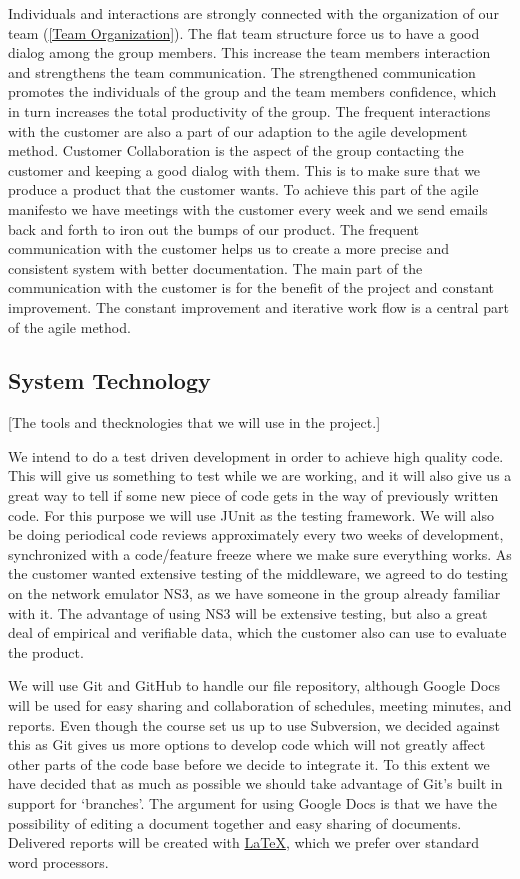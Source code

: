     Individuals and interactions are strongly connected with the organization of our team (\ref{Team Organization}). The flat team structure force us to have a good dialog among the group members. This increase the team members interaction and strengthens the team communication. The strengthened communication promotes the individuals of the group and the team members confidence, which in turn increases the total productivity of the group. The frequent interactions with the customer are also a part of our adaption to the agile development method. 
    Customer Collaboration is the aspect of the group contacting the customer and keeping a good dialog with them. This is to make sure that we produce a product that the customer wants. To achieve this part of the agile manifesto we have meetings with the customer every week and we send emails back and forth to iron out the bumps of our product. The frequent communication with the customer helps us to create a more precise and consistent system with better documentation. The main part of the communication with the customer is for the benefit of the project and constant improvement. The constant improvement and iterative work flow is a central part of the agile method. 

    \subsection{System Technology}\label{System Technology} [The tools and thecknologies that we will use in the project.]
    
    We  intend to do a test driven development in order to achieve high quality code. This will give us something to test while we are working, and it will also give us a great way to tell if some new piece of code gets in the way of previously written code. For this purpose we will use JUnit as the testing framework. We will also be doing periodical code reviews approximately every two weeks of development, synchronized with a code/feature freeze where we make sure everything works. As the customer wanted extensive testing of the middleware, we agreed to do testing on the network emulator NS3, as we have someone in the group already familiar with it. The advantage of using NS3 will be extensive testing, but also a great deal of empirical and verifiable data, which the customer also can use to evaluate the product.

    We will use Git and GitHub to handle our file repository, although Google Docs will be used for easy sharing and collaboration of schedules, meeting minutes, and reports. Even though the course set us up to use Subversion, we decided against this as Git gives us more options to develop code which will not greatly affect other parts of the code base before we decide to integrate it. To this extent we have decided that as much as possible we should take advantage of Git’s built in support for ‘branches’. The argument for using Google Docs is that we have the possibility of editing a document together and easy sharing of documents. Delivered reports will be created with \href{http://www.latex-project.org/}{\LaTeX}, which we prefer over standard word processors.


